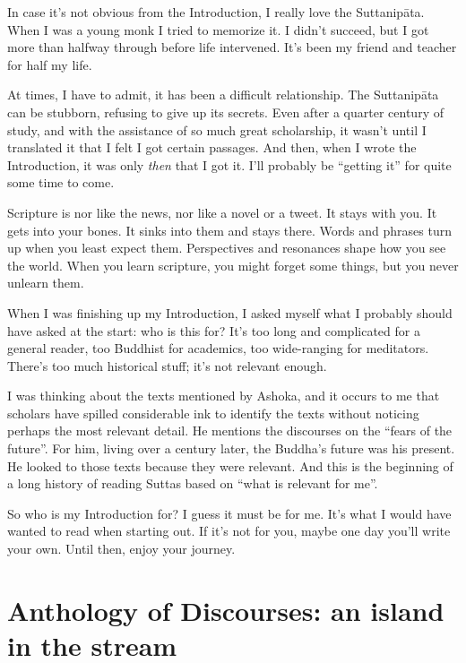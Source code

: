 \documentclass[12pt,openany]{book}%
\begin{document}
In case it’s not obvious from the Introduction, I really love the \textsanskrit{Suttanipāta}. When I was a young monk I tried to memorize it. I didn’t succeed, but I got more than halfway through before life intervened. It’s been my friend and teacher for half my life.

At times, I have to admit, it has been a difficult relationship. The \textsanskrit{Suttanipāta} can be stubborn, refusing to give up its secrets. Even after a quarter century of study, and with the assistance of so much great scholarship, it wasn’t until I translated it that I felt I got certain passages. And then, when I wrote the Introduction, it was only \emph{then} that I got it. I’ll probably be “getting it” for quite some time to come.

Scripture is nor like the news, nor like a novel or a tweet. It stays with you. It gets into your bones. It sinks into them and stays there. Words and phrases turn up when you least expect them. Perspectives and resonances shape how you see the world. When you learn scripture, you might forget some things, but you never unlearn them.

When I was finishing up my Introduction, I asked myself what I probably should have asked at the start: who is this for? It’s too long and complicated for a general reader, too Buddhist for academics, too wide-ranging for meditators. There’s too much historical stuff; it’s not relevant enough.

I was thinking about the texts mentioned by Ashoka, and it occurs to me that scholars have spilled considerable ink to identify the texts without noticing perhaps the most relevant detail. He mentions the discourses on the “fears of the future”. For him, living over a century later, the Buddha’s future was his present. He looked to those texts because they were relevant. And this is the beginning of a long history of reading Suttas based on “what is relevant for me”.

So who is my Introduction for? I guess it must be for me. It’s what I would have wanted to read when starting out. If it’s not for you, maybe one day you’ll write your own. Until then, enjoy your journey.

%
\chapter*{Anthology of Discourses: an island in the stream}
\end{document}
